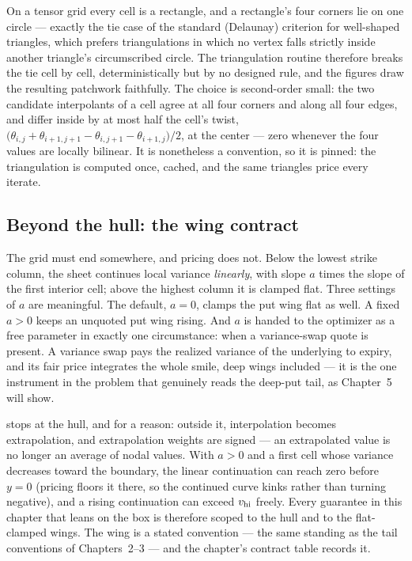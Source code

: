 \begin{remark}
\label{rem:lvdiag}
On a tensor grid every cell is a rectangle, and a rectangle's four
corners lie on one circle --- exactly the tie case of the standard
(Delaunay) criterion for well-shaped triangles, which prefers
triangulations in which no vertex falls strictly inside another
triangle's circumscribed circle.  The triangulation routine therefore breaks the tie cell by
cell, deterministically but by no designed rule, and the figures draw
the resulting patchwork faithfully.  The choice is second-order small:
the two candidate interpolants of a cell agree at all four corners and
along all four edges, and differ inside by at most half the cell's
twist,
$\big(\theta_{i,j}+\theta_{i+1,j+1}-\theta_{i,j+1}-\theta_{i+1,j}\big)/2$,
at the center --- zero whenever the four values are locally bilinear.
It is nonetheless a convention, so it is pinned: the triangulation is
computed once, cached, and the same triangles price every iterate.
\end{remark}

\subsection{Beyond the hull: the wing contract}

The grid must end somewhere, and pricing does not.  Below the lowest
strike column, the sheet continues local variance \emph{linearly},
with slope $a$ times the slope of the first interior cell; above the
highest column it is clamped flat.  Three settings of $a$ are
meaningful.  The default, $a=0$, clamps the put wing flat as well.  A
fixed $a>0$ keeps an unquoted put wing rising.  And $a$ is handed to
the optimizer as a free parameter in exactly one circumstance: when a
variance-swap quote is present.  A variance swap pays the realized
variance of the underlying to expiry, and its fair price integrates
the whole smile, deep wings included --- it is the one instrument in
the problem that genuinely reads the deep-put tail, as Chapter~5 will
show.

\begin{remark}
\label{rem:lvhull}
 stops at the hull, and for a reason: outside it,
interpolation becomes extrapolation, and extrapolation weights are
signed --- an extrapolated value is no longer an average of nodal
values.  With $a>0$ and a first cell whose variance decreases toward
the boundary, the linear continuation can reach zero before $y=0$
(pricing floors it there, so the continued curve kinks rather than
turning negative), and a rising continuation can exceed $v_{\rm hi}$
freely.  Every guarantee in this chapter that leans on the box is
therefore scoped to the hull and to the flat-clamped wings.  The wing
is a stated convention --- the same standing as the tail
conventions of Chapters~2--3 --- and the chapter's contract table
records it.
\end{remark}

